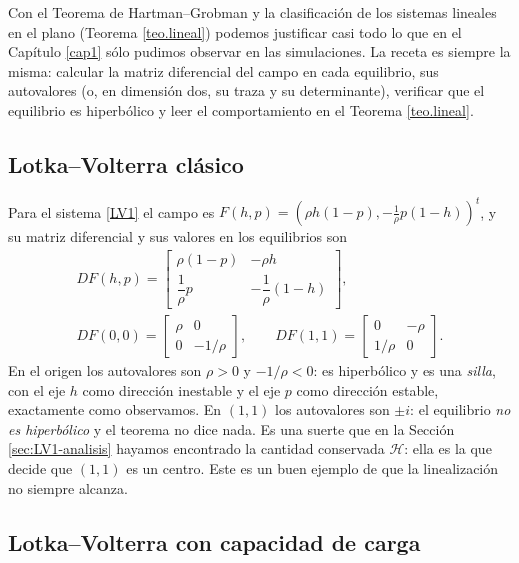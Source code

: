 \documentclass[12pt, a4paper]{amsbook}
\newcommand{\Hc}{{\mathcal H}}
\theoremstyle{remark}
\theoremstyle{definition}
\numberwithin{section}{chapter}
\numberwithin{subsection}{section}
\numberwithin{equation}{section}
\numberwithin{figure}{chapter}
\begin{document}
Con el Teorema de Hartman--Grobman y la clasificación de los sistemas lineales en el plano (Teorema \ref{teo.lineal}) podemos justificar casi todo lo que en el Capítulo \ref{cap1} sólo pudimos observar en las simulaciones. La receta es siempre la misma: calcular la matriz diferencial del campo en cada equilibrio, sus autovalores (o, en dimensión dos, su traza y su determinante), verificar que el equilibrio es hiperbólico y leer el comportamiento en el Teorema \ref{teo.lineal}.

\subsection*{Lotka--Volterra clásico}

Para el sistema \eqref{LV1} el campo es $F(h,p) = (\rho h(1-p), -\frac1\rho p(1-h))^t$, y su matriz diferencial y sus valores en los equilibrios son
\begin{gather*}
DF(h,p) =
\begin{bmatrix}
\rho(1-p) & -\rho h\\[4pt]
\dfrac{1}{\rho}p & -\dfrac{1}{\rho}(1-h)
\end{bmatrix},\\
DF(0,0) = \begin{bmatrix} \rho & 0\\ 0 & -1/\rho\end{bmatrix},\qquad
DF(1,1) = \begin{bmatrix} 0 & -\rho\\ 1/\rho & 0\end{bmatrix}.
\end{gather*}
En el origen los autovalores son $\rho>0$ y $-1/\rho<0$: es hiperbólico y es una \emph{silla}, con el eje $h$ como dirección inestable y el eje $p$ como dirección estable, exactamente como observamos. En $(1,1)$ los autovalores son $\pm i$: el equilibrio \emph{no es hiperbólico} y el teorema no dice nada. Es una suerte que en la Sección \ref{sec:LV1-analisis} hayamos encontrado la cantidad conservada $\Hc$: ella es la que decide que $(1,1)$ es un centro. Este es un buen ejemplo de que la linealización no siempre alcanza.

\subsection*{Lotka--Volterra con capacidad de carga}
\end{document}
